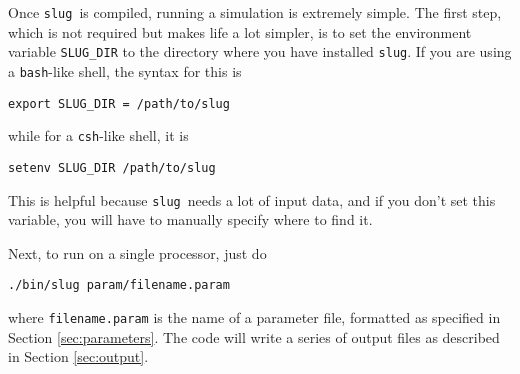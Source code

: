 \documentclass[12pt]{article}
\newcommand{\slug}{\texttt{slug}}
\begin{document}
Once \slug\ is compiled, running a simulation is extremely simple. The first step, which is not required but makes life a lot simpler, is to set the environment variable \verb=SLUG_DIR= to the directory where you have installed \slug. If you are using a \verb=bash=-like shell, the syntax for this is
\begin{verbatim}
export SLUG_DIR = /path/to/slug
\end{verbatim}
while for a \verb=csh=-like shell, it is
\begin{verbatim}
setenv SLUG_DIR /path/to/slug
\end{verbatim}
This is helpful because \slug\ needs a lot of input data, and if you don't set this variable, you will have to manually specify where to find it.

Next, to run on a single processor, just do
\begin{verbatim}
./bin/slug param/filename.param
\end{verbatim}
where \verb=filename.param= is the name of a parameter file, formatted as specified in Section \ref{sec:parameters}. The code will write a series of output files as described in Section \ref{sec:output}.
\end{document}
